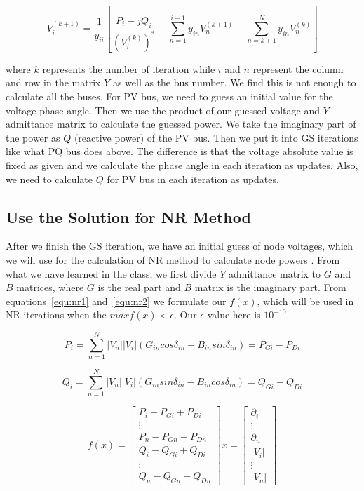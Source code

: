\documentclass[conference]{IEEEtran}
\begin{document}
\begin{equation}\label{equ:gs}
	V_{i}^{(k+1)}=\frac{1}{y_{ii}}[\frac{P_i-jQ_i}{(V_i^{(k)})^*}-\sum_{n=1}^{i-1}y_{in}V_n^{(k+1)}-\sum_{n=k+1}^Ny_{in}V_n^{(k)}]
\end{equation}

where $k$ represents the number of iteration while $i$ and $n$ represent the column and row in the matrix $Y$ as well as the bus number. We find this is not enough to calculate all the buses. For PV bus, we need to guess an initial value for the voltage phase angle. Then we use the product of our guessed voltage and $Y$ admittance matrix to calculate the guessed power. We take the imaginary part of the power as $Q$ (reactive power) of the PV bus. Then we put it into GS iterations like what PQ bus does above. The difference is that the voltage absolute value is fixed as given and we calculate the phase angle in each iteration as updates. Also, we need to calculate $Q$ for PV bus in each iteration as updates.

\subsection{Use the Solution for NR Method}
After we finish the GS iteration, we have an initial guess of node voltages, which we will use for the calculation of NR method to calculate node powers \cite{b4}. From what we have learned in the class, we first divide $Y$ admittance matrix to $G$ and $B$ matrices, where $G$ is the real part and $B$ matrix is the imaginary part. From equations~\ref{equ:nr1} and~\ref{equ:nr2} we formulate our $f(x)$, which will be used in NR iterations when the $max{f(x)}<\epsilon$. Our $\epsilon$ value here is $10^{-10}$.

\begin{equation}\label{equ:nr1}
	P_{i}=\sum_{n=1}^{N}|V_n||V_i|(G_{in}cos\delta_{in}+B_{in}sin\delta_{in})=P_{Gi}-P_{Di}
\end{equation}

\begin{equation}\label{equ:nr2}
	Q_{i}=\sum_{n=1}^{N}|V_n||V_i|(G_{in}sin\delta_{in}-B_{in}cos\delta_{in})=Q_{Gi}-Q_{Di}
\end{equation}

\begin{equation}
	f(x)=
	\begin{bmatrix}
		P_i-P_{Gi}+P_{Di} \\
		\vdots \\
		P_n-P_{Gn}+P_{Dn} \\
		Q_i-Q_{Gi}+Q_{Di} \\
		\vdots \\
		Q_n-Q_{Gn}+Q_{Dn}
	\end{bmatrix}
    x=
    \begin{bmatrix}
    	\partial_i \\
    	\vdots \\
    	\partial_n \\
    	|V_i| \\
    	\vdots \\
    	|V_n|
    \end{bmatrix}
\end{equation}
\end{document}
